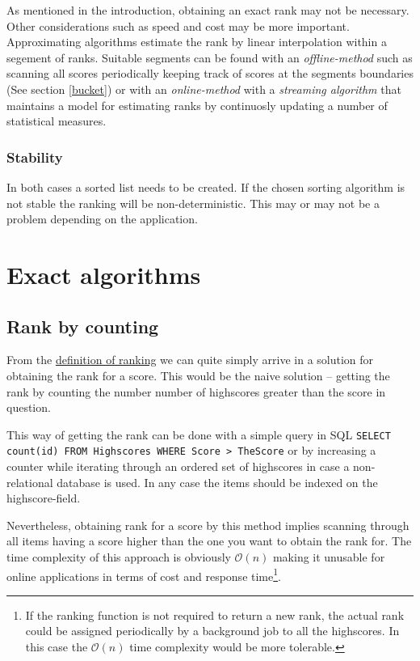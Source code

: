 As mentioned in the introduction, obtaining an exact rank may not be necessary. Other considerations such as speed and cost may be more important. Approximating algorithms estimate the rank by linear interpolation within a segement of ranks. Suitable segments can be found with an \emph{offline-method} such as scanning all scores periodically keeping track of scores at the segments boundaries (See section \ref{bucket}) or with an \emph{online-method} with a \emph{streaming algorithm} that maintains a model for estimating ranks by continuosly updating a number of statistical measures.

\subsubsection{Stability}

In both cases a sorted list needs to be created. If the chosen sorting algorithm is not stable the ranking will be non-deterministic. This may or may not be a problem depending on the application. 

\section{Exact algorithms}

\subsection{Rank by counting}

From the \hyperref[definition]{definition of ranking} we can quite simply arrive in a solution for obtaining the rank for a score. This would be the naive solution -- getting the rank by counting the number number of highscores greater than the score in question.

This way of getting the rank can be done with a simple query in SQL
\texttt{SELECT count(id) FROM Highscores WHERE Score > TheScore} or by increasing a counter while iterating through an ordered set of highscores in case a non-relational database is used. In any case the items should be indexed on the highscore-field.

Nevertheless, obtaining rank for a score by this method implies scanning through all items having a score higher than the one you want to obtain the rank for. The time complexity of this approach is obviously $\mathcal{O}(n)$ making it unusable for online applications in terms of cost and response time\footnote{If the ranking function is not required to return a new rank, the actual rank could be assigned periodically by a background job to all the highscores. In this case the $\mathcal{O}(n)$ time complexity would be more tolerable.}.

